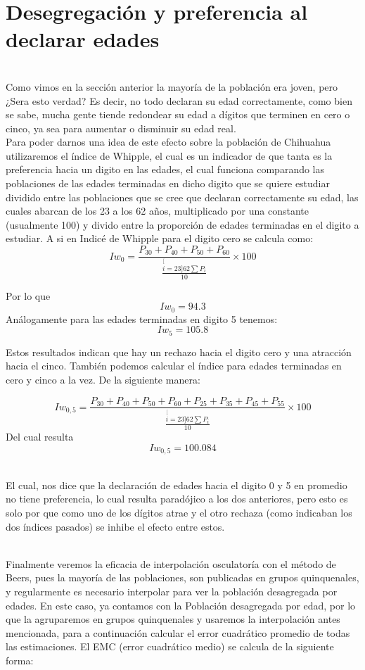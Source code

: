 \documentclass[fontsize=11pt]{article}
\begin{document}
\section*{Desegregación y preferencia al declarar edades}
\\Como vimos en la sección anterior la mayoría de la población era joven, pero ¿Sera esto verdad? Es decir, no todo declaran su edad correctamente, como bien se sabe, mucha gente tiende redondear su edad a dígitos que terminen en cero o cinco, ya sea para aumentar o disminuir su edad real. 
\\Para poder darnos una idea de este efecto sobre la población de Chihuahua utilizaremos el índice de Whipple, el cual es un indicador de que tanta es la preferencia hacia un digito en las edades, el cual funciona comparando las poblaciones de las edades terminadas en dicho digito que se quiere estudiar dividido entre las poblaciones que se cree que declaran correctamente su edad, las cuales abarcan de los 23 a los 62 años, multiplicado por una constante    (usualmente 100) y divido entre la proporción de edades terminadas en el digito a estudiar. A si en Indicé de Whipple para el digito cero se calcula como:
\[
Iw_{0}=\frac{P_{30}+P_{40}+P_{50}+P_{60}}{\frac{\stackrel[i=23]{62}{\sum}P_{i}}{10}}\times100
\]

Por lo que $$Iw_0 =94.3$$ 
Análogamente para las edades terminadas en digito 5 tenemos: $$Iw_5=105.8$$

Estos resultados indican que hay un rechazo hacia el digito cero y una atracción hacia el cinco.
También podemos calcular el índice para edades terminadas en cero y cinco a la vez. De la siguiente manera:

\[
Iw_{0,5}=\frac{P_{30}+P_{40}+P_{50}+P_{60}+P_{25}+P_{35}+P_{45}+P_{55}}{\frac{\stackrel[i=23]{62}{\sum}P_{i}}{10}}\times100
\]
Del cual resulta $$Iw_{0,5} =100.084$$

\\El cual, nos dice que la declaración de edades hacia el digito 0 y 5 en promedio no tiene preferencia, lo cual resulta paradójico a los dos anteriores, pero esto es solo por que como uno de los dígitos atrae y el otro rechaza (como indicaban los dos índices pasados) se inhibe el efecto entre estos.
 
\\Finalmente veremos la eficacia de interpolación osculatoría con el método de Beers, pues la mayoría de las poblaciones, son publicadas en grupos quinquenales, y regularmente es necesario interpolar para ver la población desagregada por edades. En este caso, ya contamos con la Población desagregada por edad, por lo que la agruparemos en grupos quinquenales y usaremos la interpolación antes mencionada, para a continuación calcular el error cuadrático promedio de todas las estimaciones. 
El EMC (error cuadrático medio) se calcula de la siguiente forma:
\end{document}
